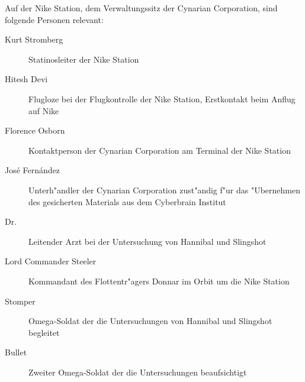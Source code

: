 
Auf der Nike Station, dem Verwaltungssitz der Cynarian Corporation, sind folgende Personen relevant:

\begin{description}
    \item [Kurt Stromberg] Statinosleiter der Nike Station
    \item [Hitesh Devi] Flugloze bei der Flugkontrolle der Nike Station, Erstkontakt beim Anflug auf Nike
    \item [Florence Osborn] Kontaktperson der Cynarian Corporation am Terminal der Nike Station
    \item [Jos\'e Fern\'andez] Unterh"andler der Cynarian Corporation zust"andig f"ur das "Ubernehmen des gesicherten 
        Materials aus dem Cyberbrain Institut
    \item [Dr.~ ] Leitender Arzt bei der Untersuchung von Hannibal und Slingshot
    \item [Lord Commander Steeler] Kommandant des Flottentr"agers Donnar im Orbit um die Nike Station
    \item [Stomper] Omega-Soldat der die Untersuchungen von Hannibal und Slingshot begleitet
    \item [Bullet] Zweiter Omega-Soldat der die Untersuchungen beaufsichtigt
\end{description}
